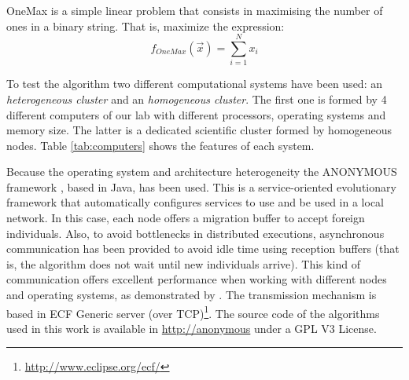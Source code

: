 \documentclass{sig-alternate}
\begin{document}
OneMax is a simple linear problem that consists in maximising the number of ones in a binary string. That is, maximize the expression:
\begin{equation}
f_{OneMax}(\vec{x}) = \sum_{i=1}^{N}{x_{i}}
\end{equation}


To test the algorithm two different computational systems have been used: an {\em heterogeneous cluster} and an {\em homogeneous cluster}. The first one is formed by 4 different computers of our lab with different processors, operating systems and memory size. The latter is a dedicated scientific cluster formed by homogeneous nodes. Table \ref{tab:computers} shows the features of each system.

\begin{table*}
\label{tab:computers}
\end{table*}

Because the operating system and architecture heterogeneity the ANONYMOUS framework \cite{OSGILIATH}, based in Java, has been used. This is a service-oriented evolutionary framework that automatically configures services to use and be used in a local network. In this case, each node offers a migration buffer to accept foreign individuals. Also, to avoid bottlenecks in distributed executions, asynchronous communication has been provided to avoid idle time using reception buffers (that is, the algorithm does not wait until new individuals arrive). This kind of communication offers excellent performance when working with different nodes and operating systems, as demonstrated by \cite{HETEROGENEOUSHARD}. The transmission mechanism is based in ECF Generic server (over TCP)\footnote{\url{http://www.eclipse.org/ecf/}}. The source code of the algorithms used in this work is available in \url{http://anonymous} under a GPL V3 License.
\end{document}
